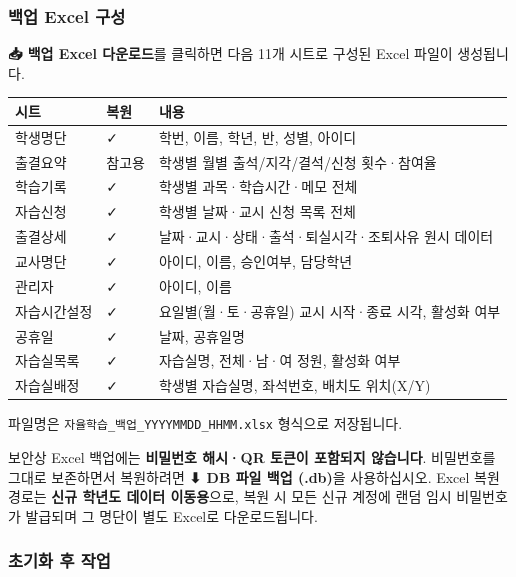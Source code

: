 \documentclass[a4paper,12pt]{article}
\newcommand{\menu}[1]{\textcolor{primary}{\textbf{#1}}}
\begin{document}
\subsubsection{백업 Excel 구성}

\menu{📥 백업 Excel 다운로드}를 클릭하면 다음 11개 시트로 구성된 Excel 파일이 생성됩니다.

\begin{center}
\begin{tabularx}{\textwidth}{llX}
\toprule
\textbf{시트} & \textbf{복원} & \textbf{내용} \\
\midrule
학생명단     & ✓      & 학번, 이름, 학년, 반, 성별, 아이디 \\
출결요약     & 참고용  & 학생별 월별 출석/지각/결석/신청 횟수·참여율 \\
학습기록     & ✓      & 학생별 과목·학습시간·메모 전체 \\
자습신청     & ✓      & 학생별 날짜·교시 신청 목록 전체 \\
출결상세     & ✓      & 날짜·교시·상태·출석·퇴실시각·조퇴사유 원시 데이터 \\
교사명단     & ✓      & 아이디, 이름, 승인여부, 담당학년 \\
관리자       & ✓      & 아이디, 이름 \\
자습시간설정 & ✓      & 요일별(월·토·공휴일) 교시 시작·종료 시각, 활성화 여부 \\
공휴일       & ✓      & 날짜, 공휴일명 \\
자습실목록   & ✓      & 자습실명, 전체·남·여 정원, 활성화 여부 \\
자습실배정   & ✓      & 학생별 자습실명, 좌석번호, 배치도 위치(X/Y) \\
\bottomrule
\end{tabularx}
\end{center}

파일명은 \texttt{자율학습\_백업\_YYYYMMDD\_HHMM.xlsx} 형식으로 저장됩니다.

\begin{notebox}
  보안상 Excel 백업에는 \textbf{비밀번호 해시·QR 토큰이 포함되지 않습니다}.
  비밀번호를 그대로 보존하면서 복원하려면 \menu{⬇ DB 파일 백업 (.db)}을 사용하십시오.
  Excel 복원 경로는 \textbf{신규 학년도 데이터 이동용}으로, 복원 시 모든 신규 계정에
  랜덤 임시 비밀번호가 발급되며 그 명단이 별도 Excel로 다운로드됩니다.
\end{notebox}

\subsubsection{초기화 후 작업}
\end{document}
